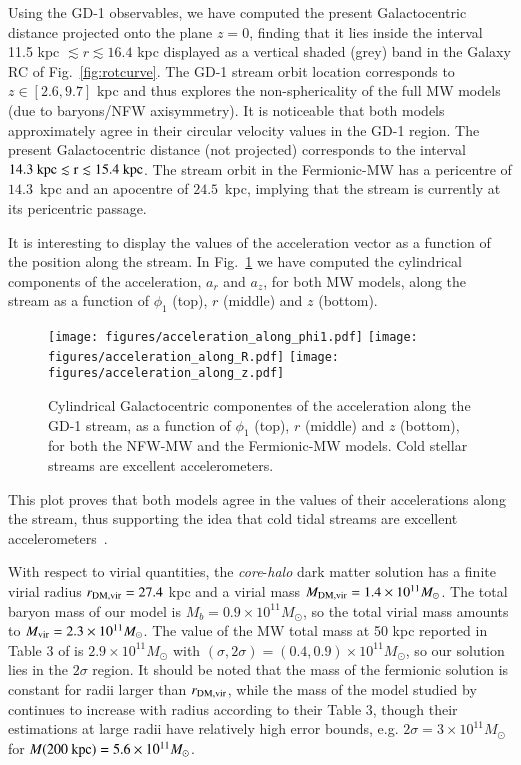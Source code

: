 \documentclass[twocolumn]{aa}
\begin{document}
Using the GD-1 observables, we have computed the present Galactocentric distance projected onto the plane $z=0$, finding that it lies inside the interval 11.5 kpc $\lesssim r \lesssim 16.4$ kpc displayed as a vertical shaded (grey) band in the Galaxy RC of Fig.~\ref{fig:rotcurve}. The GD-1 stream orbit location corresponds to $z\in [2.6, 9.7]$ kpc and thus explores the non-sphericality of the full MW models (due to baryons/NFW axisymmetry).
It is noticeable that both models approximately agree in their circular velocity values in the GD-1 region. 
The present Galactocentric distance (not projected) corresponds to the interval $14.3~\rm{kpc} \lesssim r \lesssim 15.4~\rm{kpc}$. The stream orbit in the Fermionic-MW has a pericentre of $14.3$~kpc and an apocentre
of $24.5$~kpc, implying that the stream is currently at its pericentric passage.

It is interesting to display the values of the acceleration vector as a function of the position along the stream.
In Fig.~\ref{fig:acceleration} we have computed the cylindrical components of the acceleration, $a_r$ and $a_z$,
for both MW models, along the stream as a function of $\phi_1$ (top), $r$ (middle) and $z$ (bottom).
\begin{figure}
   \centering
   \texttt{[image: figures/acceleration\_along\_phi1.pdf]}
   \texttt{[image: figures/acceleration\_along\_R.pdf]}
   \texttt{[image: figures/acceleration\_along\_z.pdf]}
   \caption{Cylindrical Galactocentric componentes of the acceleration along the GD-1 stream,
   as a function of $\phi_1$ (top), $r$ (middle) and $z$ (bottom), for both the NFW-MW and the 
   Fermionic-MW models. Cold stellar streams are excellent accelerometers.}
   \label{fig:acceleration}
\end{figure}
This plot proves that both models agree in the values of their accelerations along the stream, thus supporting the idea that cold tidal streams are excellent accelerometers~\citep{Ibata_2016,2022ApJ...940...22N,2023ApJ...945L..32C}.

With respect to virial quantities, the \textit{core}-\textit{halo} dark matter solution has a finite virial radius $r_{\rm{DM,vir}}=27.4$ kpc and a virial mass
$M_{\rm{DM,vir}}=1.4\times10^{11} M_\odot$. The total baryon mass of our model is $M_b=0.9\times10^{11}M_\odot$, so the total virial mass amounts to
$M_{\rm{vir}}=2.3\times10^{11} M_\odot$. The value of the MW total mass at 50 kpc reported in Table 3
of \citet{2014MNRAS.445.3788G} is $2.9\times10^{11} M_\odot$ with $(\sigma, 2\sigma)=(0.4,0.9)\times10^{11} M_\odot$, so our solution lies in the $2\sigma$ region.
It should be noted that the mass of the fermionic solution is constant for radii larger than
$r_{\rm{DM,vir}}$, while the mass of the model studied by \citet{2014MNRAS.445.3788G} continues to increase with radius according to their Table 3, though their estimations at large radii have relatively
high error bounds, e.g. $2\sigma=3\times10^{11} M_\odot$ for $M(200 \hbox{ kpc}) =5.6\times10^{11} M_\odot$.
\end{document}
